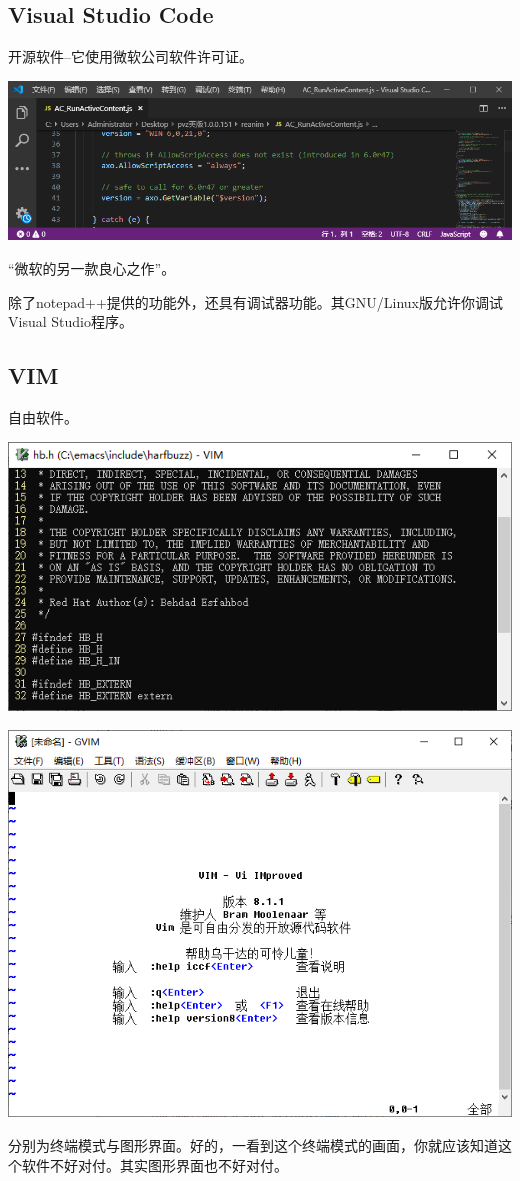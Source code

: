 \documentclass{book}
\begin{document}
\subsection{Visual Studio Code}
开源软件--它使用微软公司软件许可证。
\begin{center}
	\includegraphics[scale=0.7]{pic/vscode.PNG}
\end{center}
“微软的另一款良心之作”。\par
除了notepad++提供的功能外，还具有调试器功能。其GNU/Linux版允许你调试Visual Studio程序。
\subsection{VIM}
自由软件。
\begin{center}
	\includegraphics[scale=0.7]{pic/vim.png}\par   \includegraphics[scale=0.7]{pic/gvim.png}
\end{center}
分别为终端模式与图形界面。好的，一看到这个终端模式的画面，你就应该知道这个软件不好对付。其实图形界面也不好对付。
\end{document}
